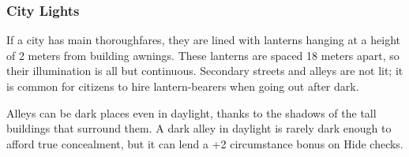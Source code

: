\subsubsection{City Lights}
If a city has main thoroughfares, they are lined with lanterns hanging at a height of 2 meters from building awnings. These lanterns are spaced 18 meters apart, so their illumination is all but continuous. Secondary streets and alleys are not lit; it is common for citizens to hire lantern-bearers when going out after dark.

Alleys can be dark places even in daylight, thanks to the shadows of the tall buildings that surround them. A dark alley in daylight is rarely dark enough to afford true concealment, but it can lend a +2 circumstance bonus on Hide checks.

